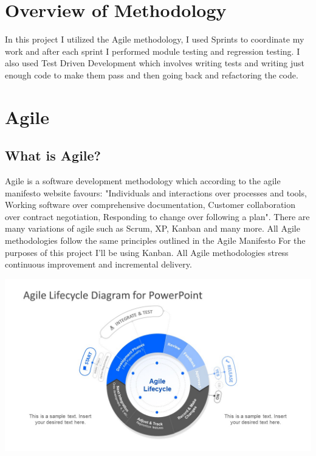 \section{Overview of Methodology}
In this project I utilized the Agile methodology, I used Sprints to coordinate my work and after each sprint I performed
module testing and regression testing.  I also used Test Driven Development which involves writing tests and writing just
enough code to make them pass and then going back and refactoring the code.
\section{Agile}
\subsection{What is Agile?}
Agile is a software development methodology which according to the agile manifesto website \cite{Agile} favours: "Individuals and interactions over processes and tools,
Working software over comprehensive documentation,
Customer collaboration over contract negotiation,
Responding to change over following a plan".  There are many variations of agile \cite{VariationsofAgile} such as Scrum, XP, Kanban and many more. All Agile methodologies follow the same principles outlined in the Agile Manifesto\cite{Agile} For the purposes of this project I'll be using Kanban.  All Agile methodologies stress
continuous improvement and incremental delivery.
\begin{center}
\includegraphics[width=\textwidth]{./img/agile.jpg}\cite{AgileImage}
\end{center}
